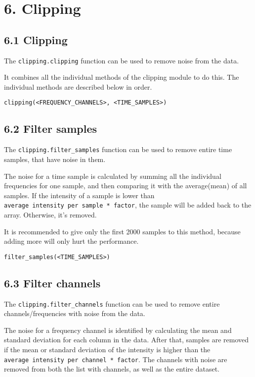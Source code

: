 \documentclass[]{article}
\begin{document}
\section{6. Clipping}\label{clipping}

\subsection{6.1 Clipping}\label{clipping-1}

The \texttt{clipping.clipping} function can be used to remove noise from
the data.

It combines all the individual methods of the clipping module to do
this. The individual methods are described below in order.

\begin{verbatim}
clipping(<FREQUENCY_CHANNELS>, <TIME_SAMPLES>)
\end{verbatim}

\subsection{6.2 Filter samples}\label{filter-samples}

The \texttt{clipping.filter\_samples} function can be used to remove
entire time samples, that have noise in them.

The noise for a time sample is calculated by summing all the individual
frequencies for one sample, and then comparing it with the average(mean)
of all samples. If the intensity of a sample is lower than
\texttt{average\ intensity\ per\ sample\ *\ factor}, the sample will be
added back to the array. Otherwise, it's removed.

It is recommended to give only the first 2000 samples to this method,
because adding more will only hurt the performance.

\begin{verbatim}
filter_samples(<TIME_SAMPLES>)
\end{verbatim}

\subsection{6.3 Filter channels}\label{filter-channels}

The \texttt{clipping.filter\_channels} function can be used to remove
entire channels/frequencies with noise from the data.

The noise for a frequency channel is identified by calculating the mean
and standard deviation for each column in the data. After that, samples
are removed if the mean or standard deviation of the intensity is higher
than the \texttt{average\ intensity\ per\ channel\ *\ factor}. The
channels with noise are removed from both the list with channels, as
well as the entire dataset.
\end{document}
